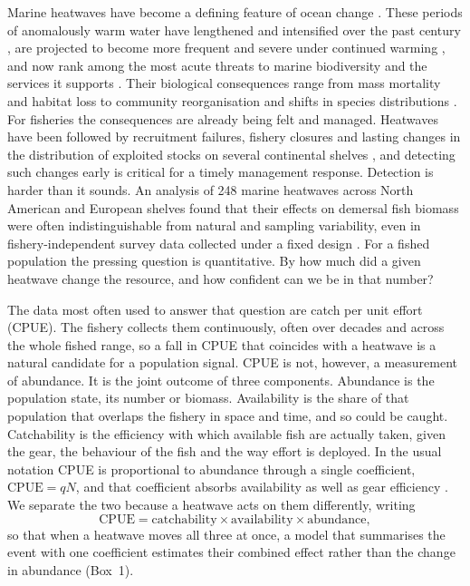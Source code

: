 \documentclass[11pt,a4paper]{article}
\newcommand{\vt}[1]{\text{#1}}
\begin{document}
Marine heatwaves have become a defining feature of ocean change \citep{hobday2016}. These periods of anomalously warm water have lengthened and intensified over the past century \citep{oliver2018}, are projected to become more frequent and severe under continued warming \citep{frolicher2018}, and now rank among the most acute threats to marine biodiversity and the services it supports \citep{smale2019}. Their biological consequences range from mass mortality and habitat loss to community reorganisation and shifts in species distributions \citep{wernberg2013,wernberg2016,babcock2019,cheung2020,afrifa2026}. For fisheries the consequences are already being felt and managed. Heatwaves have been followed by recruitment failures, fishery closures and lasting changes in the distribution of exploited stocks on several continental shelves \citep{caputi2016,cheung2020,welch2023}, and detecting such changes early is critical for a timely management response. Detection is harder than it sounds. An analysis of 248 marine heatwaves across North American and European shelves found that their effects on demersal fish biomass were often indistinguishable from natural and sampling variability, even in fishery-independent survey data collected under a fixed design \citep{fredston2023}. For a fished population the pressing question is quantitative. By how much did a given heatwave change the resource, and how confident can we be in that number?

The data most often used to answer that question are catch per unit effort (CPUE). The fishery collects them continuously, often over decades and across the whole fished range, so a fall in CPUE that coincides with a heatwave is a natural candidate for a population signal. CPUE is not, however, a measurement of abundance. It is the joint outcome of three components. Abundance is the population state, its number or biomass. Availability is the share of that population that overlaps the fishery in space and time, and so could be caught. Catchability is the efficiency with which available fish are actually taken, given the gear, the behaviour of the fish and the way effort is deployed. In the usual notation CPUE is proportional to abundance through a single coefficient, $\vt{CPUE} = qN$, and that coefficient absorbs availability as well as gear efficiency \citep{arreguin1996,wilberg2010}. We separate the two because a heatwave acts on them differently, writing
\begin{equation}
\vt{CPUE} = \text{catchability} \times \text{availability} \times \text{abundance},
\label{eq:cpue}
\end{equation}
so that when a heatwave moves all three at once, a model that summarises the event with one coefficient estimates their combined effect rather than the change in abundance (Box~1).
\end{document}
